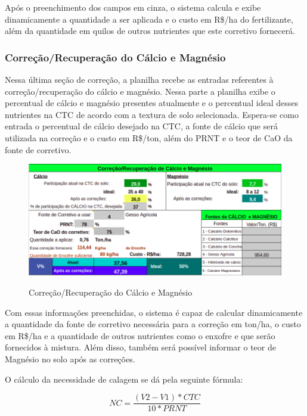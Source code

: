 Após o preenchimento dos campos em cinza, o sistema calcula e exibe dinamicamente a quantidade a ser aplicada e o custo em R\$/ha do fertilizante, além da quantidade em quilos de outros nutrientes que este corretivo fornecerá.

\subsubsection{Correção/Recuperação do Cálcio e Magnésio}
\label{subsubsec:corrreccalciomagnesio}

Nessa última seção de correção, a planilha recebe as entradas referentes à correção/recuperação do cálcio e magnésio. Nessa parte a planilha exibe o percentual de cálcio e magnésio presentes atualmente e o percentual ideal desses nutrientes na CTC de acordo com a textura de solo selecionada. Espera-se como entrada o percentual de cálcio desejado na CTC, a fonte de cálcio que será utilizada na correção e o custo em R\$/ton, além do PRNT e o teor de CaO da fonte de corretivo.

\begin{figure}[H]
    \centering
    \caption{Correção/Recuperação do Cálcio e Magnésio}
    \includegraphics[width=13cm]{./dados/figuras/planilha/corr_rec_calcio_magnesio.png}
    \label{fig:correcaoreccalciomagnesio}
\end{figure}

Com essas informações preenchidas, o sistema é capaz de calcular dinamicamente a quantidade da fonte de corretivo necessária para a correção em ton/ha, o custo em R\$/ha e a quantidade de outros nutrientes como o enxofre e que serão fornecidos à mistura. Além disso, também será possível informar o teor de Magnésio no solo após as correções.

O cálculo da necessidade de calagem se dá pela seguinte fórmula:

\[ NC
  = \dfrac{(V2 - V1) * CTC}{10 * PRNT}
\]

